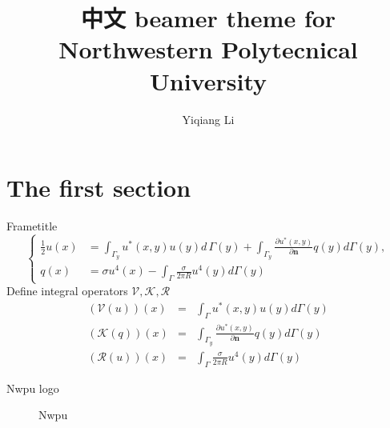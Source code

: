 \documentclass[xetex,8pt]{beamer}
\title[NPU theme]{\large \textbf{中文} beamer theme for Northwestern Polytecnical University }
\author[Y. Li]{Yiqiang Li}
\institute[Dept. Applied Math.]{Department of Applied Mathmethics}
\begin{document}
\begin{frame}[t]
\titlepage
\end{frame}

\section{The first section}
\begin{frame}[t]{Frametitle}
	\begin{equation}
		\left\{
		\begin{aligned}
			\frac{1}{2}u(x) &= \int_{\Gamma_y}u^*(x,y)u(y) d\,\Gamma (y) + \int_{\Gamma_y} \frac{\partial u^*(x,y)}{\partial \mathbf{n}} q(y) d \Gamma(y), \\
			q(x) &= \sigma u^4(x) - \int_\Gamma \frac{\sigma}{2 \pi R} u^4(y) d\Gamma(y)
		\end{aligned}
		\right.
	\end{equation}
	Define integral operators $\mathcal{V},\mathcal{K},\mathcal{R}$
		\begin{eqnarray*}
			(\mathcal{V}(u))(x) &=& \int_\Gamma u^*(x,y)u(y) d\Gamma(y) \\
			(\mathcal{K}(q))(x) &=& \int_{\Gamma_y} \frac{\partial u^*(x,y)}{\partial \mathbf{n}} q(y) d \Gamma(y) \\
			(\mathcal{R}(u))(x) &=& \int_\Gamma \frac{\sigma}{2 \pi R} u^4(y) d\Gamma(y)
		\end{eqnarray*}
\end{frame}
\begin{frame}[t]{Nwpu logo}
	\begin{figure}[htbp]
		\begin{center}
		\end{center}
		\caption{Nwpu}
		\label{fig:nwpu}
	\end{figure}
	
\end{frame}
\end{document}
